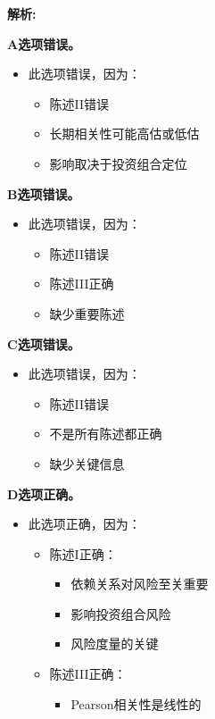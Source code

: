 \documentclass{article}
\newenvironment{explanation}
{\textbf{解析:}\par}
{\par}
\begin{document}
\begin{explanation}
    \textbf{A选项错误。}
    \begin{itemize}
        \item 此选项错误，因为：
        \begin{itemize}
            \item 陈述II错误
            \item 长期相关性可能高估或低估
            \item 影响取决于投资组合定位
        \end{itemize}
    \end{itemize}
    \textbf{B选项错误。}
    \begin{itemize}
        \item 此选项错误，因为：
        \begin{itemize}
            \item 陈述II错误
            \item 陈述III正确
            \item 缺少重要陈述
        \end{itemize}
    \end{itemize}
    \textbf{C选项错误。}
    \begin{itemize}
        \item 此选项错误，因为：
        \begin{itemize}
            \item 陈述II错误
            \item 不是所有陈述都正确
            \item 缺少关键信息
        \end{itemize}
    \end{itemize}
    \textbf{D选项正确。}
    \begin{itemize}
        \item 此选项正确，因为：
        \begin{itemize}
            \item 陈述I正确：
            \begin{itemize}
                \item 依赖关系对风险至关重要
                \item 影响投资组合风险
                \item 风险度量的关键
            \end{itemize}
            \item 陈述III正确：
            \begin{itemize}
                \item Pearson相关性是线性的

\end{itemize}
\end{itemize}
\end{itemize}
\end{explanation}
\end{document}

